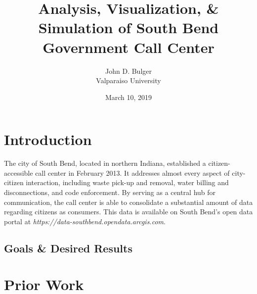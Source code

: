 \documentclass[12pt]{article}
\title{Analysis, Visualization, \& Simulation of South Bend Government Call Center}
\author{John D. Bulger\\Valparaiso University}
\date{March 10, 2019}
\begin{document}
\maketitle

\section{Introduction}
The city of South Bend, located in northern Indiana, established a citizen-accessible call center in February 2013.  It addresses almost every aspect of city-citizen interaction, including waste pick-up and removal, water billing and disconnections, and code enforcement.  By serving as a central hub for communication, the call center is able to consolidate a substantial amount of data regarding citizens as consumers.  This data is available on South Bend's open data portal at \textit{https://data-southbend.opendata.arcgis.com}.

\subsection{Goals \& Desired Results}


\section{Prior Work}
	
\end{document}
